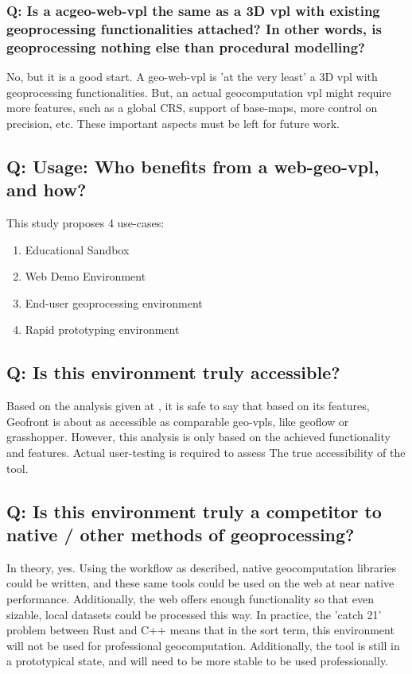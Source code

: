\subsubsection*{Q: Is a ac{geo-web-vpl} the same as a 3D vpl with existing geoprocessing functionalities attached? In other words, is geoprocessing nothing else than procedural modelling?}

No, but it is a good start. 
A geo-web-vpl is 'at the very least' a 3D vpl with geoprocessing functionalities. 
But, an actual geocomputation vpl might require more features, such as a global CRS, support of base-maps, more control on precision, etc. 
These important aspects must be left for future work.

\subsection*{Q: Usage: Who benefits from a web-geo-vpl, and how? }
This study proposes 4 use-cases:
\begin{enumerate}[-]
  \item Educational Sandbox
  \item Web Demo Environment
  \item End-user geoprocessing environment 
  \item Rapid prototyping environment
\end{enumerate}

\subsection*{Q: Is this environment truly accessible?}

Based on the analysis given at , it is safe to say that based on its features, Geofront is about as accessible as comparable geo-vpls, like geoflow or grasshopper. 
However, this analysis is only based on the achieved functionality and features. 
Actual user-testing is required to assess The true accessibility of the tool.

\subsection*{Q: Is this environment truly a competitor to native / other methods of geoprocessing?}

In theory, yes.
Using the workflow as described, native geocomputation libraries could be written, and these same tools could be used on the web at near native performance. 
Additionally, the web offers enough functionality so that even sizable, local datasets could be processed this way.
In practice, the 'catch 21' problem between Rust and C++ means that in the sort term, this environment will not be used for professional geocomputation.
Additionally, the tool is still in a prototypical state, and will need to be more stable to be used professionally. 

